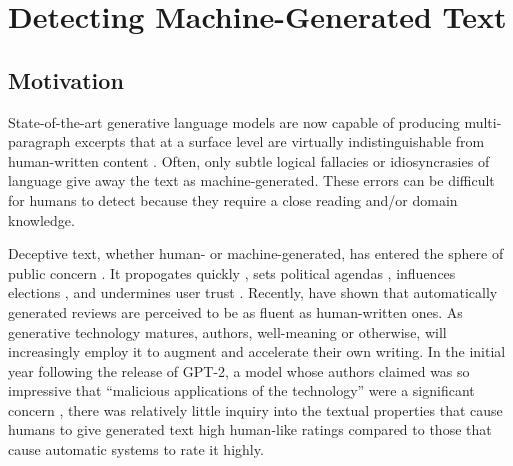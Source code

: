 \chapter{Detecting Machine-Generated Text}
\label{chap:decoding}

\section{Motivation}


State-of-the-art generative language models are now capable of producing multi-paragraph excerpts that at a surface level are virtually indistinguishable from human-written content \citep{zellers2019defending,radford2019language,adelani2020generating}.
Often, only subtle logical fallacies or idiosyncrasies of language give away the text as machine-generated.
These errors can be difficult for humans to detect because they require a close reading and/or domain knowledge.

Deceptive text, whether human- or machine-generated, has entered the sphere of public concern \citep{cooke2018fake}.
It propogates quickly \citep{vosoughi2018spread}, sets political agendas \citep{vargo2018agenda}, influences elections \citep{allcott2017social}, and undermines user trust \cite{wang2012serf, song2015crowdtarget}.
Recently, \citet{adelani2020generating} have shown that automatically generated reviews are perceived to be as fluent as human-written ones.
As generative technology matures, authors, well-meaning or otherwise, will increasingly employ it to augment and accelerate their own writing.
In the initial year following the release of GPT-2, a model whose authors claimed was so impressive that ``malicious applications of the technology'' were a significant concern \citep{radford2019language}, there was relatively little inquiry into the textual properties that cause humans to give generated text high human-like ratings compared to those that cause automatic systems to rate it highly.

